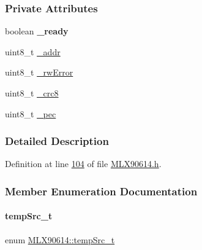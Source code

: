 \subsubsection*{Private Attributes}
\begin{DoxyCompactItemize}
\item 
\mbox{\label{class_m_l_x90614_abcc1f76b9f1c99ae25e365736616679a}} 
boolean {\bfseries \+\_\+ready}
\item 
uint8\+\_\+t \mbox{\hyperlink{class_m_l_x90614_a768925264f76f33f9bf98aec1cbec6a9}{\+\_\+addr}}
\item 
uint8\+\_\+t \mbox{\hyperlink{class_m_l_x90614_a8c203cc9359c283d07682ba7dbcc5de3}{\+\_\+rw\+Error}}
\item 
uint8\+\_\+t \mbox{\hyperlink{class_m_l_x90614_add210d34992507e8ccb753a040b14395}{\+\_\+crc8}}
\item 
uint8\+\_\+t \mbox{\hyperlink{class_m_l_x90614_a2526978eb988a8712baee6dca596be15}{\+\_\+pec}}
\end{DoxyCompactItemize}


\subsubsection{Detailed Description}


Definition at line \mbox{\hyperlink{_m_l_x90614_8h_source_l00104}{104}} of file \mbox{\hyperlink{_m_l_x90614_8h_source}{M\+L\+X90614.\+h}}.



\subsubsection{Member Enumeration Documentation}
\mbox{\label{class_m_l_x90614_a500f8c49b00e725d5c201092d9c02b8b}} 
\paragraph{\texorpdfstring{temp\+Src\+\_\+t}{tempSrc\_t}}
{\footnotesize\ttfamily enum \mbox{\hyperlink{class_m_l_x90614_a500f8c49b00e725d5c201092d9c02b8b}{M\+L\+X90614\+::temp\+Src\+\_\+t}}}

